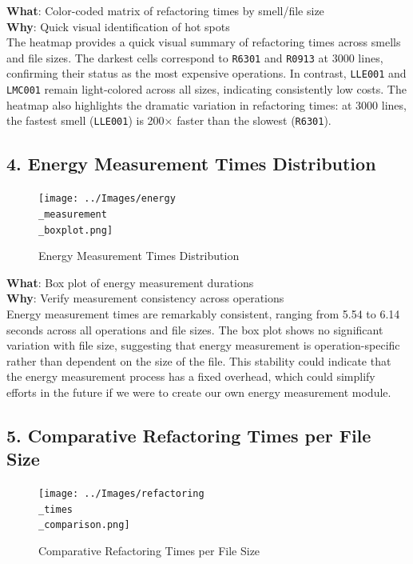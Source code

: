 \documentclass[12pt, titlepage]{article}
\begin{document}
\noindent \textbf{What}: Color-coded matrix of refactoring times by
smell/file size\\

\noindent \textbf{Why}: Quick visual identification of hot spots\\

The heatmap provides a quick visual summary of refactoring times
across smells and file sizes. The darkest cells correspond to
\texttt{R6301} and \texttt{R0913} at 3000 lines, confirming their
status as the most expensive operations. In contrast, \texttt{LLE001}
and \texttt{LMC001} remain light-colored across all sizes, indicating
consistently low costs. The heatmap also highlights the dramatic
variation in refactoring times: at 3000 lines, the fastest smell
(\texttt{LLE001}) is 200× faster than the slowest (\texttt{R6301}).

\subsection*{4. Energy Measurement Times Distribution}
\begin{figure}[H]
  \centering
  \texttt{[image: ../Images/energy\\\_measurement\\\_boxplot.png]}
  \caption{Energy Measurement Times Distribution}
\end{figure}

\noindent \textbf{What}: Box plot of energy measurement durations\\

\noindent \textbf{Why}: Verify measurement consistency across operations\\

Energy measurement times are remarkably consistent, ranging from 5.54
to 6.14 seconds across all operations and file sizes.
The box plot shows no significant variation with file size,
suggesting that energy measurement is operation-specific
rather than dependent on the size of the file. This stability could
indicate that the energy measurement process has a fixed
overhead, which could simplify efforts in the future if we were to
create our own energy measurement module.

\subsection*{5. Comparative Refactoring Times per File Size}
\begin{figure}[H]
  \centering
  \texttt{[image: ../Images/refactoring\\\_times\\\_comparison.png]}
  \caption{Comparative Refactoring Times per File Size}
\end{figure}
\end{document}
